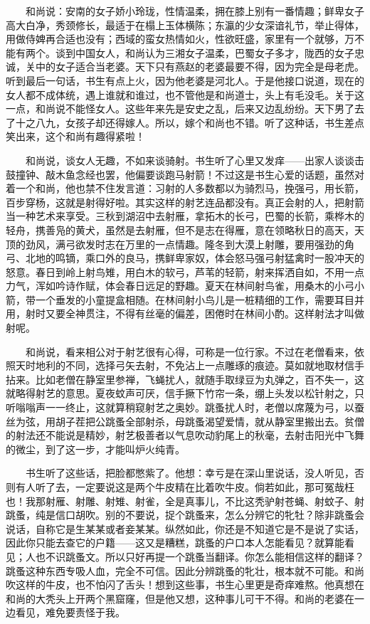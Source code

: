 　　和尚说：安南的女子娇小玲珑，性情温柔，拥在膝上别有一番情趣；鲜卑女子高大白净，秀颈修长，最适于在榻上玉体横陈；东瀛的少女深谙礼节，举止得体，用做侍婢再合适也没有；西域的蛮女热情如火，性欲旺盛，家里有一个就够，万不能有两个。谈到中国女人，和尚认为三湘女子温柔，巴蜀女子多才，陇西的女子忠诚，关中的女子适合当老婆。天下只有燕赵的老婆最要不得，因为完全是母老虎。听到最后一句话，书生有点上火，因为他老婆是河北人。于是他接口说道，现在的女人都不成体统，遇上谁就和谁过，也不管他是和尚道士，头上有毛没毛。关于这一点，和尚说不能怪女人。这些年来先是安史之乱，后来又边乱纷纷。天下男了去了十之八九，女孩子却还得嫁人。所以，嫁个和尚也不错。听了这种话，书生差点笑出来，这个和尚有趣得紧啦！ 

　　和尚说，谈女人无趣，不如来谈骑射。书生听了心里又发痒——出家人谈谈击鼓撞钟、敲木鱼念经也罢，他偏要谈跑马射箭！不过这是书生心爱的话题，虽然对着一个和尚，他也禁不住发言道：习射的人多数都以为骑烈马，挽强弓，用长箭，百步穿杨，这就是射得好啦。其实这样的射艺连品都没有。真正会射的人，把射箭当一种艺术来享受。三秋到湖沼中去射雁，拿拓木的长弓，巴蜀的长箭，乘桦木的轻舟，携善凫的黄犬，虽然是去射雁，但不是志在得雁，意在领略秋日的高天，天顶的劲风，满弓欲发时志在万里的一点情趣。隆冬到大漠上射雕，要用强劲的角弓、北地的鸣镝，乘口外的良马，携鲜卑家奴，体会怒马强弓射猛禽时一股冲天的怒意。春日到岭上射鸟雉，用白木的软弓，芦苇的轻箭，射来挥洒自如，不用一点力气，浑如吟诗作赋，体会春日远足的野趣。夏天在林间射鸟雀，用桑木的小弓小箭，带一个垂发的小童提盒相随。在林间射小鸟儿是一桩精细的工作，需要耳目并用，射时又要全神贯注，不得有丝毫的偏差，困倦时在林间小酌。这样射法才叫做射呢。 

　　和尚说，看来相公对于射艺很有心得，可称是一位行家。不过在老僧看来，依照天时地利的不同，选择弓矢去射，不免沾上一点雕琢的痕迹。莫如就地取材信手拈来。比如老僧在静室里参禅，飞蝇扰人，就随手取绿豆为丸弹之，百不失一，这就略得射艺的意思。夏夜蚊声可厌，信手撅下竹帘一条，绷上头发以松针射之，只听嗡嗡声一一终止，这就算稍窥射艺之奥妙。跳蚤扰人时，老僧以席蔑为弓，以蚕丝为弦，用胡子茬把公跳蚤全部射杀，母跳蚤渴望爱情，就从静室里搬出去。贫僧的射法还不能说是精妙，射艺极善者以气息吹动豹尾上的秋毫，去射击阳光中飞舞的微尘，到了这一步，才能叫炉火纯青。 

　　书生听了这些话，把脸都憋紫了。他想：幸亏是在深山里说话，没人听见，否则有人听了去，一定要说这是两个牛皮精在比着吹牛皮。倘若如此，那可冤哉枉也！我那射雁、射雕、射雉、射雀，全是真事儿，不比这秃驴射苍蝇、射蚊子、射跳蚤，纯是信口胡吹。别的不要说，捉个跳蚤来，怎么分辨它的牝牡？除非跳蚤会说话，自称它是生某某或者妾某某。纵然如此，你还是不知道它是不是说了实话，因此你只能去查它的户籍——这又是糟糕，跳蚤的户口本人怎能看见？就算能看见；人也不识跳蚤文。所以只好再提一个跳蚤当翻译。你怎么能相信这样的翻译？跳蚤这种东西专吸人血，完全不可信。因此分辨跳蚤的牝壮，根本就不可能。和尚吹这样的牛皮，也不怕闪了舌头！想到这些事，书生心里更是奇痒难熬。他真想在和尚的大秃头上开两个黑窟窿，但是他又想，这种事儿可干不得。和尚的老婆在一边看见，难免要责怪于我。 

